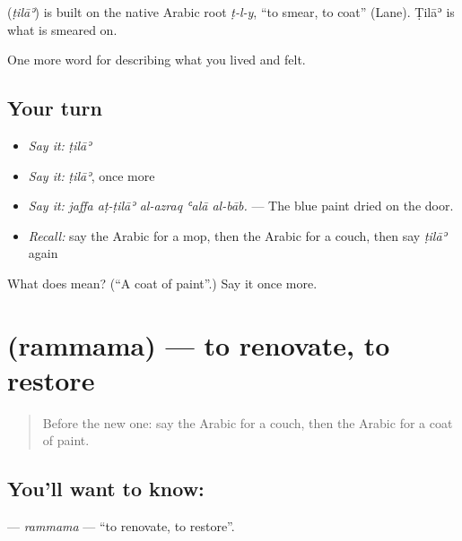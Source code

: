 \begin{cousinweb}
\textbf{} (\emph{ṭilāʾ}) is built on the native Arabic root \emph{ṭ-l-y}, \textquotedblleft{}to smear, to coat\textquotedblright{} (Lane). Ṭilāʾ is what is smeared on.
\end{cousinweb}

\begin{grammarlens}[title={What you've built}]
One more word for describing what you lived and felt.
\end{grammarlens}

\subsection*{Your turn}
\begin{itemize}
\raggedright
  \item \emph{Say it:} \emph{ṭilāʾ}
  \item \emph{Say it:} \emph{ṭilāʾ}, once more
  \item \emph{Say it:} \emph{jaffa aṭ-ṭilāʾ al-azraq ʿalā al-bāb.} — The blue paint dried on the door.
  \item \emph{Recall:} say the Arabic for a mop, then the Arabic for a couch, then say \emph{ṭilāʾ} again
\end{itemize}

\begin{tcolorbox}[breakable,colback=teal!4,colframe=teal!35!black,title={Before you move on}]
What does  mean? (\textquotedblleft{}A coat of paint\textquotedblright{}.) Say it once more.
\end{tcolorbox}
\section[\texorpdfstring{\ar{رمم} (rammama)}{رمم (rammama)}]{ (rammama) — to renovate, to restore}

\label{lesson:AR-C552-rammama}



\begin{quote}
Before the new one: say the Arabic for a couch, then the Arabic for a coat of paint.
\end{quote}

\subsection*{You'll want to know: }
\textbf{} — \emph{rammama} — \textquotedblleft{}to renovate, to restore\textquotedblright{}.

